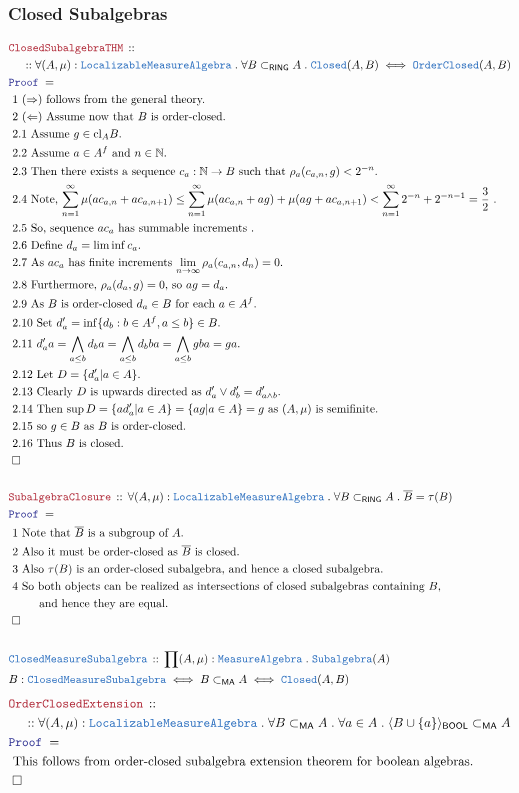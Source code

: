 \documentclass[12pt]{scrartcl}
\newcommand{\TYPE}[1]{\textcolor{NavyBlue}{\mathtt{#1}}}
\newcommand{\LOGIC}[1]{\textcolor{Blue}{\mathtt{#1}}}
\newcommand{\THM}[1]{\textcolor{Maroon}{\mathtt{#1}}}
\renewcommand{\.}{\; . \;}
\newcommand{\Theorem}[2]{& \THM{#1} \, :: \, #2 \\ & \Proof = \\ }
\newcommand{\DeclareType}[2]{& \TYPE{#1} \, :: \, #2 \\}
\newcommand{\DefineNamedType}[4]{& #1 : \TYPE{#2} \iff #3 \iff #4 \\}
\newcommand{\NewLine}{\\ & \kern 1pc}
\newcommand{\Page}[1]{ \begin{align*} #1 \end{align*}   }
\newcommand{\Nat}{\mathbb{N} }
\newcommand{\QED}{\; \square}
\newcommand{\EndProof}{& \QED \\}
\newcommand{\Proof}{\LOGIC{Proof} \; }
\newcommand{\Explain}[1]{& \text{#1.} \\}
\newcommand{\ExplainFurther}[1]{& \text{#1} \\}
\newcommand{\OC}{\TYPE{OrderClosed}}
\newcommand{\BOOL}{\mathsf{BOOL}}
\newcommand{\Closed}{\TYPE{Closed}}
\DeclareMathOperator*{\cl}{cl}
\newcommand{\Loc}{\TYPE{Localizable}}
\newcommand{\MA}{\TYPE{MeasureAlgebra}}
\newcommand{\ma}{\mathsf{MA}}
\begin{document}
\subsubsection{Closed Subalgebras}
\Page{
	\Theorem{ClosedSubalgebraTHM}
	{
		\NewLine ::		
		\forall (A,\mu) : \Loc\MA \.
		\forall B \subset_{\mathsf{RING}} A \.
		\Closed(A,B) \iff \OC(A,B) 
	}
	\Explain{ 1 $(\Rightarrow)$ follows from the general theory}
	\Explain{ 2 $(\Leftarrow)$ Assume now that $B$ is order-closed}
	\Explain{ 2.1 Assume $g \in {\cl}_A B$}
	\Explain{ 2.2 Assume $a \in A^f$ and $n \in \Nat$} 
	\Explain{ 2.3 Then there exists a sequence $c_a : \Nat \to B$ 
		such that $\rho_a(c_{a,n},g) < 2^{-n}$}
	\Explain{ 2.4 Note, $\sum^\infty_{n=1} \mu(ac_{a,n} + ac_{a,n + 1}) 
		\le \sum^\infty_{n=1} \mu(ac_{a,n} +ag) + \mu(ag + ac_{a,n + 1}) < 
		 \sum^\infty_{n=1} 2^{-n} + 2^{-n-1} = \frac{3}{2} $ }
	\Explain{ 2.5 So, sequence $ac_a$ has summable increments  }
	\Explain{ 2.6 Define $d_a = \liminf c_{a}$}
	\Explain{ 2.7 As $ac_a$ has finite increments $\lim_{n \to \infty} \rho_a(c_{a,n},d_n) = 0$}
	\Explain{ 2.8 Furthermore, $\rho_a(d_a,g) = 0$, so $ag = d_a$}
	\Explain{ 2.9 As $B$ is order-closed $d_a \in B$ for each $a \in A^f$}
	\Explain{ 2.10 Set $d'_a = \inf \{ d_b : b \in A^f, a \le b  \} \in B$}
	\Explain{ 2.11  $d'_a a  = \bigwedge_{a \le b} d_b a = \bigwedge_{a \le b} d_b b a  = 
		  \bigwedge_{a \le b}  g b a = g a$}
	\Explain{ 2.12 Let $D = \{ d_a' | a \in A \} $}
	\Explain{ 2.13 Clearly $D$ is upwards directed as $d'_a \vee d'_b = d'_{a \wedge b}$}
	\Explain{ 2.14 Then  $\sup D = \{ ad_a' | a \in A \} = \{ ag | a \in A \} = g$
		as $(A,\mu)$ is semifinite}
	\Explain{ 2.15 so $g \in B$ as $B$ is order-closed}
	\Explain{ 2.16 Thus $B$ is closed}
	\EndProof
	\\
	\Theorem{SubalgebraClosure}
	{
		\forall (A,\mu) : \Loc\MA \.
		\forall B \subset_{\mathsf{RING}} A \.
		\overline{B} =  \tau(B)
	}
	\Explain{ 1 Note that $\overline{B}$ is a subgroup of $A$}
	\Explain{ 2 Also it must be order-closed as $\overline{B}$ is closed}
	\Explain{ 3 Also $\tau(B)$ is an order-closed subalgebra, and hence a closed subalgebra}
	\ExplainFurther{ 4 So both objects can be realized as intersections 
		of closed subalgebras containing $B$,}
	\Explain{ $\quad\quad$	and hence they are equal}
	\EndProof      
	\\
	\DeclareType{ClosedMeasureSubalgebra}{\prod (A,\mu) : \MA \. \TYPE{Subalgebra}(A)}
	\DefineNamedType{B}{ClosedMeasureSubalgebra}{B \subset_{\ma} A}
	{\Closed(A,B)}
}\Page{
	\Theorem{OrderClosedExtension}
	{
		\NewLine ::		
		\forall (A,\mu) : \Loc\MA \.
		\forall B \subset_{\ma} A \.
		\forall a \in A \. 
		\langle B \cup \{a\} \rangle_{\BOOL} \subset_{\ma} A
	}
	\Explain{ This follows from order-closed subalgebra extension theorem for boolean algebras}
	\EndProof
}
\newpage
\end{document}
